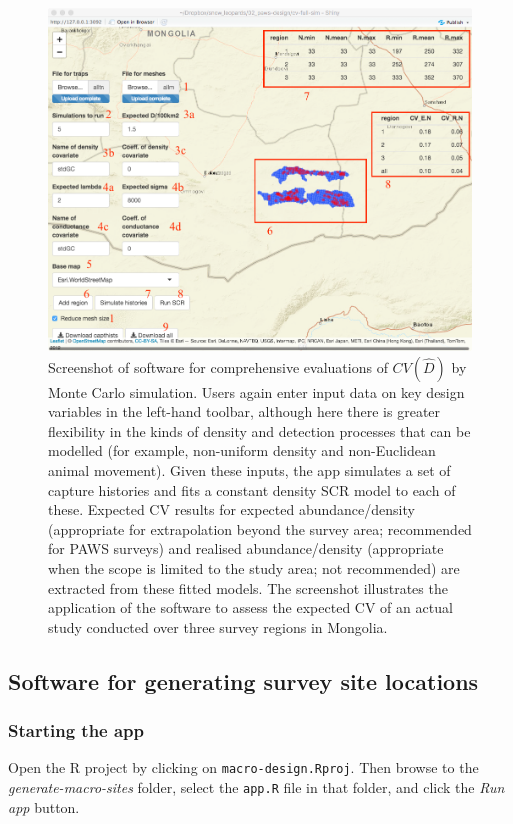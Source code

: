 \documentclass[a4paper,11pt]{article} %
\begin{document}
\begin{figure}[htbp]
\centering
\includegraphics[width=\textwidth]{cv-full}
\caption{Screenshot of software for comprehensive evaluations of $CV(\hat{D})$ by Monte Carlo simulation. Users again enter input data on key design variables in the left-hand toolbar, although here there is greater flexibility in the kinds of density and detection processes that can be modelled (for example, non-uniform density and non-Euclidean animal movement). Given these inputs, the app simulates a set of capture histories and fits a constant density SCR model to each of these. Expected CV results for expected abundance/density (appropriate for extrapolation beyond the survey area; recommended for PAWS surveys) and realised abundance/density (appropriate when the scope is limited to the study area; not recommended) are extracted from these fitted models. The screenshot illustrates the application of the software to assess the expected CV of an actual study conducted over three survey regions in Mongolia.}
\label{cva-1}
\end{figure} 

\subsection{Software for generating survey site locations}

\subsubsection{Starting the app}
Open the R project by clicking on \texttt{macro-design.Rproj}. Then browse to the \textit{generate-macro-sites} folder, select the \texttt{app.R} file in that folder, and click the \textit{Run app} button. 
\end{document}
